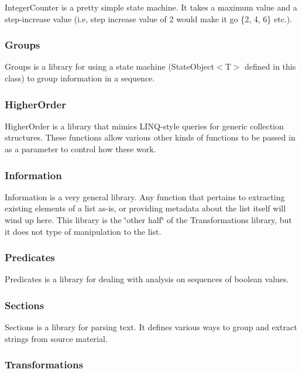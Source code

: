 Integer\+Counter is a pretty simple state machine. It takes a maximum value and a step-\/increase value (i.\+e, step increase value of 2 would make it go \{2, 4, 6\} etc.).

\subsubsection*{Groups}

Groups is a library for using a state machine (State\+Object$<$\+T$>$ defined in this class) to group information in a sequence.

\subsubsection*{Higher\+Order}

Higher\+Order is a library that mimics L\+I\+N\+Q-\/style queries for generic collection structures. These functions allow various other kinds of functions to be passed in as a parameter to control how these work.

\subsubsection*{Information}

Information is a very general library. Any function that pertains to extracting existing elements of a list as-\/is, or providing metadata about the list itself will wind up here. This library is the \char`\"{}other half\char`\"{} of the Transformations library, but it does not type of manipulation to the list.

\subsubsection*{Predicates}

Predicates is a library for dealing with analysis on sequences of boolean values.

\subsubsection*{Sections}

Sections is a library for parsing text. It defines various ways to group and extract strings from source material.

\subsubsection*{Transformations}

